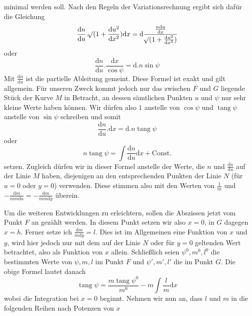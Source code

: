 %
minimal werden soll. Nach den Regeln der Variationsrechnung ergibt sich dafür die Gleichung
\[
\frac{\mathrm{d}n}{\mathrm{d}u}\mathord{.}\mathord{{}^{}\!\surd}(1+\frac{\mathrm{d}u^2}{\mathrm{d}x^2})\mathrm{d}x=\mathrm{d}\frac{\frac{n\mathrm{d}u}{\mathrm{d}x}}{\mathord{{}^{}\!\surd}(1+\frac{\mathrm{d}u^2}{\mathrm{d}x^2})}
\]
oder
\[
\frac{\mathrm{d}n}{\mathrm{d}u}\mathord{.}\frac{\mathrm{d}x}{\cos\psi}=\mathrm{d}\mathord{.}n\sin\psi
\]
Mit \(\tfrac{\mathrm{d}n}{\mathrm{d}u}\) ist die partielle Ableitung gemeint. Diese Formel ist exakt und gilt allgemein. Für unseren Zweck kommt jedoch nur das zwischen \(F\) und \(G\) liegende Stück der Kurve \(M\) in Betracht, an dessen sämtlichen Punkten \(u\) und \(\psi\) nur sehr kleine Werte haben können. Wir dürfen also \(1\) anstelle von \(\cos\psi\) und \(\operatorname{tang}\psi\) anstelle von \(\sin\psi\) schreiben und somit
\[
\frac{\mathrm{d}n}{\mathrm{d}u}\mathord{.}\mathrm{d}x=\mathrm{d}\mathord{.}n\operatorname{tang}\psi
\]
oder
\[
n\operatorname{tang}\psi=\int\frac{\mathrm{d}n}{\mathrm{d}u}\mathrm{d}x+\text{Const.}
\]
setzen. Zugleich dürfen wir in dieser Formel anstelle der Werte, die \(n\) und \(\tfrac{\mathrm{d}n}{\mathrm{d}u}\) auf der Linie \(M\) haben, diejenigen an den entsprechenden Punkten der Linie \(N\) (für \(u=0\) oder \(y=0\)) verwenden. Diese stimmen also mit den Werten von \(\tfrac{1}{m}\) und \(-\tfrac{\mathrm{d}m}{mm\mathrm{d}u}=-\tfrac{\mathrm{d}m}{mm\mathrm{d}y}\) überein.

Um die weiteren Entwicklungen zu erleichtern, sollen die Abszissen jetzt vom Punkt \(F\) an gezählt werden. In diesem Punkt setzen wir also \(x=0\), in \(G\) dagegen \(x=h\). Ferner setze ich \(\tfrac{\mathrm{d}m}{m\mathrm{d}y}=l\). Dies ist im Allgemeinen eine Funktion von \(x\) und \(y\), wird hier jedoch nur mit dem auf der Linie \(N\) oder für \(y=0\) geltenden Wert betrachtet, also als Funktion von \(x\) allein. Schließlich seien \(\psi^0,m^0,l^0\) die bestimmten Werte von \(\psi,m,l\) im Punkt \(F\) und \(\psi',m',l'\) die im Punkt \(G\). Die obige Formel lautet danach
\[
\operatorname{tang}\psi=\frac{m\operatorname{tang}\psi^0}{m^0}-m\int\frac{l}{m}\mathrm{d}x
\]
wobei die Integration bei \(x=0\) beginnt. Nehmen wir nun an, dass \(l\) und \(m\) in die folgenden Reihen nach Potenzen von \(x\)
